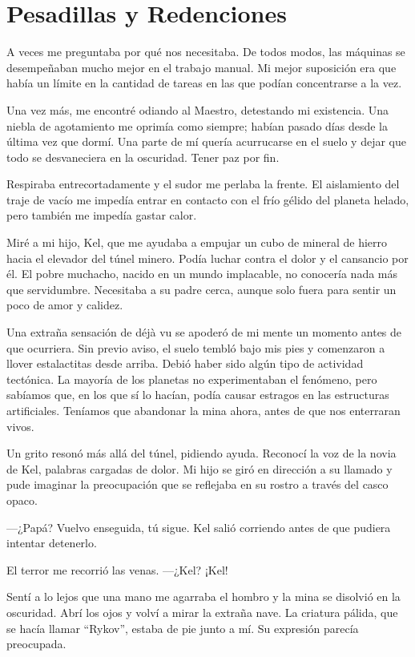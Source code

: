 \chapter{Pesadillas y Redenciones}\label{sec:pesadillas-y-redenciones}

A veces me preguntaba por qué nos necesitaba. De todos modos, las máquinas se desempeñaban mucho mejor en el trabajo manual. Mi mejor suposición era que había un límite en la cantidad de tareas en las que podían concentrarse a la vez.

Una vez más, me encontré odiando al Maestro, detestando mi existencia. Una niebla de agotamiento me oprimía como siempre; habían pasado días desde la última vez que dormí. Una parte de mí quería acurrucarse en el suelo y dejar que todo se desvaneciera en la oscuridad. Tener paz por fin.

Respiraba entrecortadamente y el sudor me perlaba la frente. El aislamiento del traje de vacío me impedía entrar en contacto con el frío gélido del planeta helado, pero también me impedía gastar calor.

Miré a mi hijo, Kel, que me ayudaba a empujar un cubo de mineral de hierro hacia el elevador del túnel minero. Podía luchar contra el dolor y el cansancio por él. El pobre muchacho, nacido en un mundo implacable, no conocería nada más que servidumbre. Necesitaba a su padre cerca, aunque solo fuera para sentir un poco de amor y calidez.

Una extraña sensación de déjà vu se apoderó de mi mente un momento antes de que ocurriera. Sin previo aviso, el suelo tembló bajo mis pies y comenzaron a llover estalactitas desde arriba. Debió haber sido algún tipo de actividad tectónica. La mayoría de los planetas no experimentaban el fenómeno, pero sabíamos que, en los que sí lo hacían, podía causar estragos en las estructuras artificiales. Teníamos que abandonar la mina ahora, antes de que nos enterraran vivos.

Un grito resonó más allá del túnel, pidiendo ayuda. Reconocí la voz de la novia de Kel, palabras cargadas de dolor. Mi hijo se giró en dirección a su llamado y pude imaginar la preocupación que se reflejaba en su rostro a través del casco opaco.

—¿Papá? Vuelvo enseguida, tú sigue. Kel salió corriendo antes de que pudiera intentar detenerlo.

El terror me recorrió las venas. —¿Kel? ¡Kel!

Sentí a lo lejos que una mano me agarraba el hombro y la mina se disolvió en la oscuridad. Abrí los ojos y volví a mirar la extraña nave. La criatura pálida, que se hacía llamar “Rykov”, estaba de pie junto a mí. Su expresión parecía preocupada.

